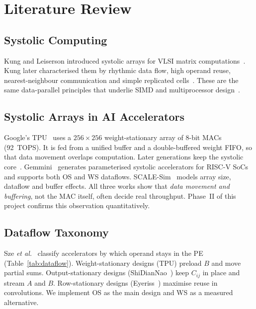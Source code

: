 \section{Literature Review}

\subsection{Systolic Computing}
Kung and Leiserson introduced systolic arrays for VLSI matrix
computations~\cite{kung1979systolic}. Kung later characterised them by
rhythmic data flow, high operand reuse, nearest-neighbour communication
and simple replicated cells~\cite{kung1982why}. These are the same
data-parallel principles that underlie SIMD and multiprocessor
design~\cite{culler_pca}.

\subsection{Systolic Arrays in AI Accelerators}
Google's TPU~\cite{jouppi2017tpu} uses a $256\times256$ weight-stationary
array of 8-bit MACs (92~TOPS). It is fed from a unified buffer and a
double-buffered weight FIFO, so that data movement overlaps computation.
Later generations keep the systolic core~\cite{jouppi2021tpuv4i}.
Gemmini~\cite{genc2021gemmini} generates parameterised systolic
accelerators for RISC-V SoCs and supports both OS and WS dataflows.
SCALE-Sim~\cite{samajdar2018scalesim} models array size, dataflow and buffer
effects. All three works show that \emph{data movement and buffering},
not the MAC itself, often decide real throughput. Phase~II of this project
confirms this observation quantitatively.

\subsection{Dataflow Taxonomy}
Sze \emph{et al.}~\cite{sze2017efficient} classify accelerators by which
operand stays in the PE (Table~\ref{tab:dataflow}). Weight-stationary
designs (TPU) preload $B$ and move partial sums. Output-stationary designs
(ShiDianNao~\cite{du2015shidiannao}) keep $C_{ij}$ in place and stream $A$
and $B$. Row-stationary designs (Eyeriss~\cite{chen2017eyeriss}) maximise
reuse in convolutions. We implement OS as the main design and WS as a
measured alternative.

